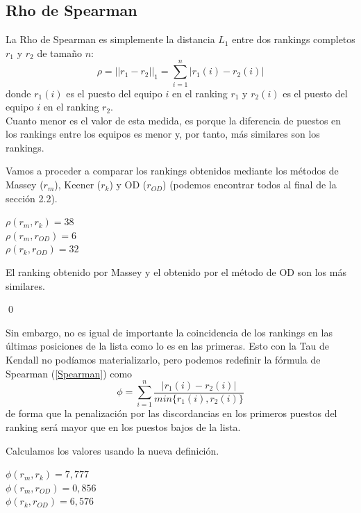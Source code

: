 \subsection{Rho de Spearman}
La Rho de Spearman es simplemente la distancia $L_{1}$ entre dos rankings completos $r_{1}$ y $r_{2}$ de tamaño $n$:
\begin{equation} \label{Spearman}
	\rho = ||r_{1} - r_{2}||_{1}= \sum_{i=1}^{n} |r_{1}(i) - r_{2}(i)|
\end{equation}
donde $r_{1}(i)$ es el puesto del equipo $i$ en el ranking $r_{1}$ y $r_{2}(i)$ es el puesto del equipo $i$ en el ranking $r_{2}$. \\

Cuanto menor es el valor de esta medida, es porque la diferencia de puestos en los rankings entre los equipos  es menor y, por tanto, más similares son los rankings.
\begin{ejem} Vamos a proceder a comparar los rankings obtenidos mediante los métodos de Massey ($r_{m}$), Keener ($r_{k}$) y OD ($r_{OD}$) (podemos encontrar todos al final de la sección 2.2).
\end{ejem}
	\begin{center}
		$ \rho (r_{m},r_{k}) = 38$\\
		$ \rho (r_{m},r_{OD}) = 6$\\
		$ \rho (r_{k},r_{OD}) = 32$
	\end{center}
	
	El ranking obtenido por Massey y el obtenido por el método de OD son los más similares.
	
\qed

Sin embargo, no es igual de importante la coincidencia de los rankings en las últimas posiciones de la lista como lo es en las primeras. Esto con la Tau de Kendall no podíamos materializarlo, pero podemos redefinir la fórmula de Spearman (\ref{Spearman}) como 
\begin{equation}
	\phi = \sum_{i=1}^{n} \dfrac{|r_{1}(i) - r_{2}(i)|}{min\{r_{1}(i),r_{2}(i)\}}
\end{equation}
de forma que la penalización por las discordancias en los primeros puestos del ranking será mayor que en los puestos bajos de la lista. 

\begin{ejem} Calculamos los valores usando la nueva definición.
\end{ejem}	
	\begin{center}
		$ \phi (r_{m},r_{k}) = 7,777$\\
		$ \phi (r_{m},r_{OD}) = 0,856$\\
		$ \phi (r_{k},r_{OD}) = 6,576$ 
	\end{center}
	
